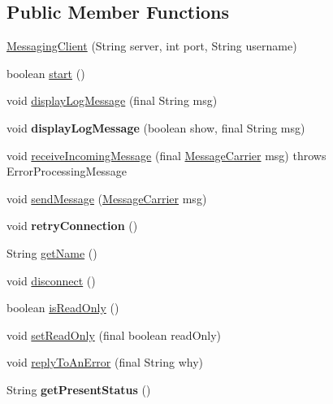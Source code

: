\subsection*{Public Member Functions}
\begin{DoxyCompactItemize}
\item 
\hyperlink{classgov_1_1fnal_1_1ppd_1_1dd_1_1chat_1_1MessagingClient_ae80bb10f995ac1e56519651d6e7bbc3a}{Messaging\-Client} (String server, int port, String username)
\item 
boolean \hyperlink{classgov_1_1fnal_1_1ppd_1_1dd_1_1chat_1_1MessagingClient_a68a15cf975653221f512387755cf392e}{start} ()
\item 
void \hyperlink{classgov_1_1fnal_1_1ppd_1_1dd_1_1chat_1_1MessagingClient_a13f893f839b69ca54b3ff1e7d8e890d7}{display\-Log\-Message} (final String msg)
\item 
\hypertarget{classgov_1_1fnal_1_1ppd_1_1dd_1_1chat_1_1MessagingClient_afa39b6278a4a60bf1b272e1a70317dfb}{void {\bfseries display\-Log\-Message} (boolean show, final String msg)}\label{classgov_1_1fnal_1_1ppd_1_1dd_1_1chat_1_1MessagingClient_afa39b6278a4a60bf1b272e1a70317dfb}

\item 
void \hyperlink{classgov_1_1fnal_1_1ppd_1_1dd_1_1chat_1_1MessagingClient_a99ad14ab2630ad413d96ca8a5f456216}{receive\-Incoming\-Message} (final \hyperlink{classgov_1_1fnal_1_1ppd_1_1dd_1_1chat_1_1MessageCarrier}{Message\-Carrier} msg)  throws Error\-Processing\-Message 
\item 
void \hyperlink{classgov_1_1fnal_1_1ppd_1_1dd_1_1chat_1_1MessagingClient_aff870447473176df03894302f39cabd2}{send\-Message} (\hyperlink{classgov_1_1fnal_1_1ppd_1_1dd_1_1chat_1_1MessageCarrier}{Message\-Carrier} msg)
\item 
\hypertarget{classgov_1_1fnal_1_1ppd_1_1dd_1_1chat_1_1MessagingClient_a1db3a15685ceaa8514f041edb3dea297}{void {\bfseries retry\-Connection} ()}\label{classgov_1_1fnal_1_1ppd_1_1dd_1_1chat_1_1MessagingClient_a1db3a15685ceaa8514f041edb3dea297}

\item 
String \hyperlink{classgov_1_1fnal_1_1ppd_1_1dd_1_1chat_1_1MessagingClient_afe1ec3b4d646cebe99db9579a6682643}{get\-Name} ()
\item 
void \hyperlink{classgov_1_1fnal_1_1ppd_1_1dd_1_1chat_1_1MessagingClient_ab28012456765215ffdf3b9beb3f3ef00}{disconnect} ()
\item 
boolean \hyperlink{classgov_1_1fnal_1_1ppd_1_1dd_1_1chat_1_1MessagingClient_a0f0d1ad1f8dcf7eec17aea757a892f36}{is\-Read\-Only} ()
\item 
void \hyperlink{classgov_1_1fnal_1_1ppd_1_1dd_1_1chat_1_1MessagingClient_a17056456457c874463b76d4bd0c7c167}{set\-Read\-Only} (final boolean read\-Only)
\item 
void \hyperlink{classgov_1_1fnal_1_1ppd_1_1dd_1_1chat_1_1MessagingClient_afcf0a1f43fdbdee733d51f75ad9845f9}{reply\-To\-An\-Error} (final String why)
\item 
\hypertarget{classgov_1_1fnal_1_1ppd_1_1dd_1_1chat_1_1MessagingClient_a774e53e588366cf5ab9ec1497e355844}{String {\bfseries get\-Present\-Status} ()}\label{classgov_1_1fnal_1_1ppd_1_1dd_1_1chat_1_1MessagingClient_a774e53e588366cf5ab9ec1497e355844}


\end{DoxyCompactItemize}
